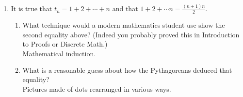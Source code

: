 \documentclass[12pt]{article}
\begin{document}
\begin{enumerate}
\begin{enumerate}
	\item It is true that $t_n=1+2+\cdots+n$ and that $1+2+\cdots n=\frac{(n+1)n}{2}.$
		\begin{enumerate}
		\item What technique would a modern mathematics student use show the second equality above? (Indeed you probably proved this in Introduction to Proofs or Discrete Math.)\\
		
		Mathematical induction.
		
		\item What is a reasonable guess about how the Pythagoreans deduced that equality?\\
		
		Pictures made of dots rearranged in various ways.
		\end{enumerate}
	\end{enumerate}
\end{enumerate}
\end{document}
